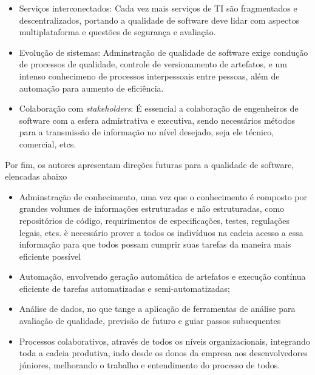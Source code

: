 \documentclass[14pt]{article}
\begin{document}
\begin{itemize}
    \item {Serviços interconectados}: Cada vez mais serviços de TI são fragmentados e descentralizados, portando a qualidade de software deve lidar com aspectos multiplataforma e questões de segurança e avaliação.

\item{Evolução de sistemas}: Adminstração de qualidade de software exige condução de processos de qualidade, controle de versionamento de artefatos, e um intenso conhecimeno de processos interpessoais entre pessoas, além de automação para aumento de eficiência.

\item{Colaboração com \textit{stakeholders}}: É essencial a colaboração de engenheiros de software com a esfera admistrativa e executiva, sendo necessários métodos para a transmissão de informação no nível desejado, seja ele técnico, comercial, etcs.
\end{itemize}
Por fim, os autores apresentam direções futuras para a qualidade de software, elencadas abaixo
\begin{itemize}
        \item Adminstração de conhecimento, uma vez que o conhecimento é composto por grandes volumes de informações estruturadas e não estruturadas, como repositórios de código, requirimentos de especificações, testes, regulações legais, etcs. è necessário prover a todos os indivíduos na cadeia acesso a essa informação para que todos possam cumprir suas tarefas da maneira mais eficiente possível
        \item Automação, envolvendo geração automática de artefatos e execução contínua eficiente de tarefas automatizadas e semi-automatizadas;
        \item Análise de dados, no que tange a aplicação de ferramentas de análise para avaliação  de qualidade, previsão de futuro e guiar passos subsequentes
        \item Processos colaborativos, através de todos os níveis organizacionais, integrando toda a cadeia produtiva, indo desde os donos da empresa aos desenvolvedores júniores, melhorando o trabalho e entendimento do processo de todos.
    \end{itemize}
    


%
%
\end{document}
